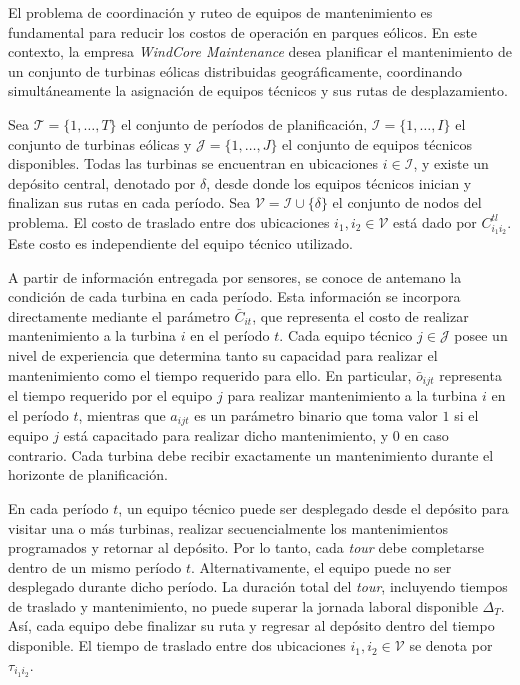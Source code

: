 El problema de coordinación y ruteo de equipos de mantenimiento es fundamental para reducir los costos de operación en parques eólicos. En este contexto, la empresa \textit{WindCore Maintenance} desea planificar el mantenimiento de un conjunto de turbinas eólicas distribuidas geográficamente, coordinando simultáneamente la asignación de equipos técnicos y sus rutas de desplazamiento.

Sea $\mathcal{T}=\{1,\dots,T\}$ el conjunto de períodos de planificación, $\mathcal{I}=\{1,\dots,I\}$ el conjunto de turbinas eólicas y $\mathcal{J}=\{1,\dots,J\}$ el conjunto de equipos técnicos disponibles. Todas las turbinas se encuentran en ubicaciones $i\in\mathcal{I}$, y existe un depósito central, denotado por $\delta$, desde donde los equipos técnicos inician y finalizan sus rutas en cada período. Sea $\mathcal{V}=\mathcal{I}\cup\{\delta\}$ el conjunto de nodos del problema. El costo de traslado entre dos ubicaciones $i_1,i_2\in\mathcal{V}$ está dado por $C_{i_1i_2}^{tl}$. Este costo es independiente del equipo técnico utilizado.

A partir de información entregada por sensores, se conoce de antemano la condición de cada turbina en cada período. Esta información se incorpora directamente mediante el parámetro $\bar{C}_{it}$, que representa el costo de realizar mantenimiento a la turbina $i$ en el período $t$. Cada equipo técnico $j\in\mathcal{J}$ posee un nivel de experiencia que determina tanto su capacidad para realizar el mantenimiento como el tiempo requerido para ello. En particular, $\bar{o}_{ijt}$ representa el tiempo requerido por el equipo $j$ para realizar mantenimiento a la turbina $i$ en el período $t$, mientras que $a_{ijt}$ es un parámetro binario que toma valor $1$ si el equipo $j$ está capacitado para realizar dicho mantenimiento, y $0$ en caso contrario. Cada turbina debe recibir exactamente un mantenimiento durante el horizonte de planificación.

En cada período $t$, un equipo técnico puede ser desplegado desde el depósito para visitar una o más turbinas, realizar secuencialmente los mantenimientos programados y retornar al depósito. Por lo tanto, cada \textit{tour} debe completarse dentro de un mismo período $t$. Alternativamente, el equipo puede no ser desplegado durante dicho período. La duración total del \textit{tour}, incluyendo tiempos de traslado y mantenimiento, no puede superar la jornada laboral disponible $\Delta_T$. Así, cada equipo debe finalizar su ruta y regresar al depósito dentro del tiempo disponible. El tiempo de traslado entre dos ubicaciones $i_1,i_2\in\mathcal{V}$ se denota por $\tau_{i_1i_2}$.


